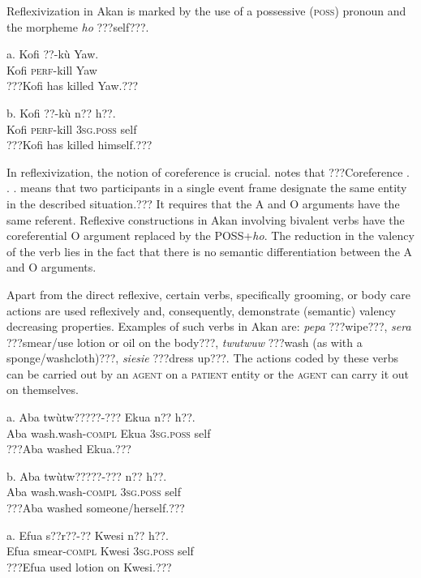\documentclass[output=paper]{langsci/langscibook}
\begin{document}
Reflexivization in Akan is marked by the use of a possessive (\textsc{poss}) pronoun and the morpheme \emph{ho} ???self???.


\ea
\gll a.  Kofi  ??-k\`{u}    Yaw.\\
       Kofi  \textsc{perf}{}-kill  Yaw\\
\glt ???Kofi has killed Yaw.???
\z

\ea
\gll  b.  Kofi    ??-k\`{u}    n??    h??.\\
       Kofi    \textsc{perf}{}-kill  \textsc{3sg.poss}  self\\
\glt ???Kofi has killed himself.???
\z

In reflexivization, the notion of coreference is crucial. \citet[44]{Kemmer1993} notes that ???Coreference . . .  means that two participants in a single event frame designate the same entity in the described situation.???  It requires that the A and O arguments have the same referent. Reflexive constructions in Akan involving bivalent verbs have the coreferential O argument replaced by the POSS+\emph{ho}.  The reduction in the valency of the verb lies in the fact that there is no semantic differentiation between the A and O arguments. 

Apart from the direct reflexive, certain verbs, specifically grooming, or body care actions \citep{Kemmer1993} are used reflexively and, consequently, demonstrate (semantic) valency decreasing properties. Examples of such verbs in Akan are: \emph{pepa} ???wipe???, \emph{sera} ???smear/use lotion or oil on the body???, \emph{twutwuw} ???wash (as with a sponge/washcloth)???, \emph{siesie} ???dress up???. The actions coded by these verbs can be carried out by an \textsc{agent} on a \textsc{patient} entity or the \textsc{agent} can carry it out on themselves. 

\ea
\gll a.  Aba  tw\`{u}tw?????-???    Ekua  n??    h??.\\
       Aba  wash.wash-\textsc{compl}  Ekua  \textsc{3sg.poss}  self\\
\glt   ???Aba washed Ekua.???
\z

\ea
\gll  b.  Aba  tw\`{u}tw?????-???    n??    h??.\\
       Aba  wash.wash-\textsc{compl}  \textsc{3sg.poss}  self\\
\glt   ???Aba washed someone/herself.???
\z

\ea
\gll a.  Efua  s??r??-??    Kwesi    n??    h??.\\
       Efua  smear-\textsc{compl}  Kwesi    \textsc{3sg.poss}  self\\
\glt   ???Efua used lotion on Kwesi.???
\z
\end{document}
